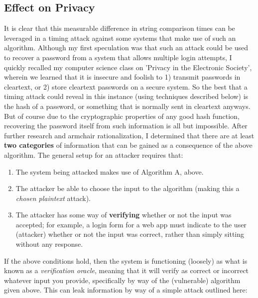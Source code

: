 \documentclass{article}
\providecommand{\tightlist}{
    \setlength{\itemsep}{0pt}\setlength{\parskip}{0pt}
}
\begin{document}
\subsection{Effect on Privacy}
It is clear that this measurable difference in string comparison times can be leveraged in a timing attack against some systems that make use of such an algorithm.
Although my first speculation was that such an attack could be used to recover a password from a system that allows multiple login attempts, I quickly recalled my computer science class on 'Privacy in the Electronic Society', wherein we learned that it is insecure and foolish to 1) transmit passwords in cleartext, or 2) store cleartext passwords on a secure system.
So the best that a timing attack could reveal in this instance (using techniques described below) is the hash of a password, or something that is normally sent in cleartext anyways.
But of course due to the cryptographic properties of any good hash function, recovering the password itself from such information is all but impossible. \cite{hash}
After further research and armchair rationalization, I determined that there are at least \textbf{two categories} of information that can be gained as a consequence of the above algorithm. The general setup for an attacker requires that:
\begin{enumerate}\tightlist
  \item The system being attacked makes use of Algorithm A, above.
  \item The attacker be able to choose the input to the algorithm (making this a \textit{chosen plaintext} attack).
  \item The attacker has some way of \textbf{verifying} whether or not the input was accepted; for example, a login form for a web app must indicate to the user (attacker) whether or not the input was correct, rather than simply sitting without any response.
\end{enumerate}

If the above conditions hold, then the system is functioning (loosely) as what is known as a \textit{verification oracle}, meaning that it will verify as correct or incorrect whatever input you provide, specifically by way of the (vulnerable) algorithm given above. This can leak information by way of a simple attack outlined here:
\end{document}
